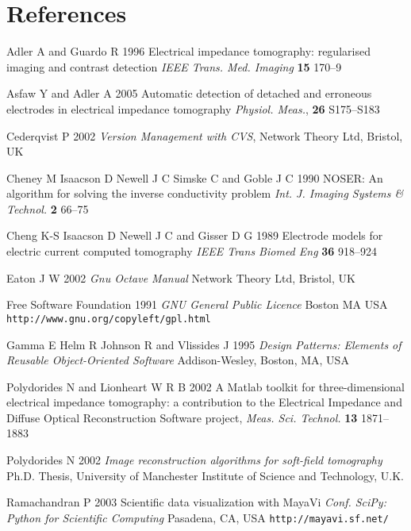 \documentclass[12pt]{iopart}
\begin{document}
\section*{References}
\begin{thebibliography}{99}

Adler A and Guardo R
1996
Electrical impedance tomography: regularised imaging and contrast detection 
\textit{IEEE Trans. Med. Imaging} \textbf{15} 170--9

Asfaw Y and Adler A
 2005
Automatic detection of detached and erroneous electrodes in electrical impedance tomography
{\it Physiol. Meas.}, {\bf 26} S175--S183

Cederqvist P 2002
{\it Version Management with CVS},
Network Theory Ltd, Bristol, UK

Cheney M
Isaacson D
Newell J C
Simske C and
Goble J C 1990
NOSER: An algorithm for solving the inverse conductivity problem
\textit{Int. J. Imaging Systems \& Technol.} \textbf{2} 66--75


Cheng K-S
Isaacson D
Newell J C and
Gisser D G
1989
Electrode models for electric current
computed tomography
{\it IEEE Trans Biomed Eng}
{\bf 36} 918--924

Eaton J W 2002
{\it Gnu Octave Manual}
Network Theory Ltd, Bristol, UK

Free Software Foundation 1991
{\it GNU General Public Licence}
Boston MA USA
{\tt http://www.gnu.org/copyleft/gpl.html}

Gamma E Helm R Johnson R and Vlissides J 1995
{\it Design Patterns: Elements of Reusable Object-Oriented Software}
Addison-Wesley, Boston, MA, USA

Polydorides N and Lionheart W R B
2002
A Matlab toolkit for three-dimensional electrical impedance
tomography: a contribution to the Electrical Impedance and
Diffuse Optical Reconstruction Software project,
{\it Meas. Sci. Technol.} {\bf 13} 1871--1883 

Polydorides N 
2002
{\it Image reconstruction algorithms for soft-field tomography}
Ph.D. Thesis,
University of Manchester Institute of Science and Technology, U.K. 

Ramachandran P 2003
Scientific data visualization with MayaVi
{\it Conf. SciPy: Python for Scientific Computing}
Pasadena, CA, USA
{\tt http://mayavi.sf.net/}


\end{thebibliography}
\end{document}

